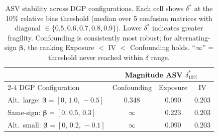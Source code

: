 \begin{table}[t]
\centering
\caption{ASV stability across DGP configurations. Each cell shows $\delta^*$ at the 10\% relative bias threshold (median over 5 confusion matrices with diagonal $\in\{0.5,0.6,0.7,0.8,0.9\}$). Lower $\delta^*$ indicates greater fragility. Confounding is consistently most robust; for alternating-sign $\boldsymbol{\beta}$, the ranking Exposure $<$ IV $<$ Confounding holds. ``$\infty$\!\!'' = threshold never reached within $\delta$ range.}
\label{tab:asv_stability}
\small
\begin{tabular}{l ccc}
\toprule
 & \multicolumn{3}{c}{Magnitude ASV $\delta^*_{10\%}$} \\
\cmidrule(lr){2-4}
DGP Configuration & Confounding & Exposure & IV \\
\midrule
Alt.\ large: $\boldsymbol{\beta}=[0,\,1.0,\,-0.5]$ & 0.348 & 0.090 & 0.203 \\
Same-sign: $\boldsymbol{\beta}=[0,\,0.5,\,0.3]$ & $\infty$ & 0.223 & 0.203 \\
Alt.\ small: $\boldsymbol{\beta}=[0,\,0.2,\,-0.1]$ & $\infty$ & 0.090 & 0.203 \\
\bottomrule
\end{tabular}
\end{table}